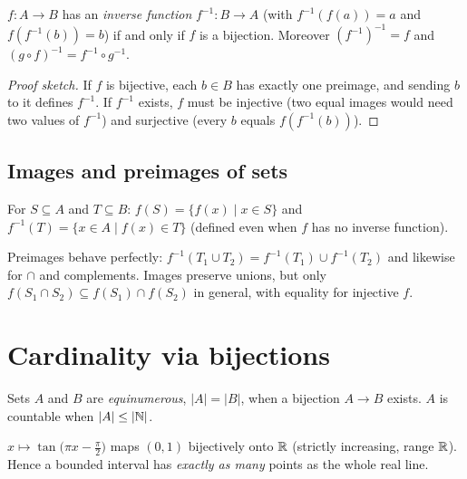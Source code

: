 \begin{theorem}\label{thm:inverse}
$f : A \to B$ has an \emph{inverse function} $f^{-1} : B \to A$ (with
$f^{-1}(f(a)) = a$ and $f(f^{-1}(b)) = b$) if and only if $f$ is a bijection.
Moreover $(f^{-1})^{-1} = f$ and
$(g \circ f)^{-1} = f^{-1} \circ g^{-1}$.
\end{theorem}

\begin{proof}[Proof sketch]
If $f$ is bijective, each $b \in B$ has exactly one preimage, and sending $b$
to it defines $f^{-1}$. If $f^{-1}$ exists, $f$ must be injective (two equal
images would need two values of $f^{-1}$) and surjective (every $b$ equals
$f(f^{-1}(b))$).
\end{proof}

\subsection{Images and preimages of sets}

\begin{definition}
For $S \subseteq A$ and $T \subseteq B$:
$f(S) = \{f(x) \mid x \in S\}$ and
$f^{-1}(T) = \{x \in A \mid f(x) \in T\}$ (defined even when $f$ has no
inverse function).
\end{definition}

Preimages behave perfectly:
$f^{-1}(T_1 \cup T_2) = f^{-1}(T_1) \cup f^{-1}(T_2)$ and likewise for
$\cap$ and complements. Images preserve unions, but only
$f(S_1 \cap S_2) \subseteq f(S_1) \cap f(S_2)$ in general, with equality for
injective $f$.

\section{Cardinality via bijections}

\begin{definition}
Sets $A$ and $B$ are \emph{equinumerous}, $|A| = |B|$, when a bijection
$A \to B$ exists. $A$ is countable when $|A| \le |\mathbb{N}|$.
\end{definition}

\begin{example}[A bijection $(0,1) \to \R$]\label{ex:tan}
$x \mapsto \tan\bigl(\pi x - \tfrac{\pi}{2}\bigr)$ maps $(0,1)$ bijectively
onto $\mathbb{R}$ (strictly increasing, range $\mathbb{R}$). Hence a bounded interval has
\emph{exactly as many} points as the whole real line.
\end{example}

